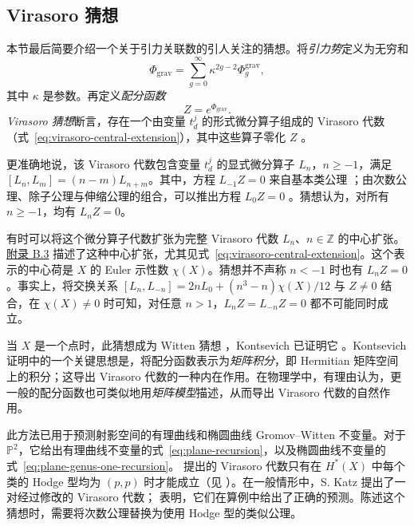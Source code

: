 \subsection{Virasoro 猜想}\label{subsec:virasoro-conjecture}
本节最后简要介绍一个关于引力关联数的引人关注的猜想。将\emph{引力势}定义为无穷和
\[
\Phi_{\mathrm{grav}}=\sum_{g=0}^{\infty}\kappa^{2g-2}\Phi_g^{\mathrm{grav}},
\]
其中 $\kappa$ 是参数。再定义\emph{配分函数}
\[
Z=e^{\Phi_{\mathrm{grav}}}.
\]
\emph{Virasoro 猜想}断言，存在一个由变量 $t_d^j$ 的形式微分算子组成的 Virasoro 代数（式~\eqref{eq:virasoro-central-extension}），其中这些算子零化 $Z$ 。

更准确地说，该 Virasoro 代数包含变量 $t_d^j$ 的显式微分算子 $L_n$，$n\ge-1$，满足 $[L_n,L_m]=(n-m)L_{n+m}$。其中，方程 $L_{-1}Z=0$ 来自基本类公理 ；由次数公理、除子公理与伸缩公理的组合，可以推出方程 $L_0Z=0$ 。猜想认为，对所有 $n\ge-1$，均有 $L_nZ=0$。

有时可以将这个微分算子代数扩张为完整 Virasoro 代数 $L_n$、$n\in\mathbb Z$ 的中心扩张。\hyperref[sec:conformal-field-theories]{附录 B.3} 描述了这种中心扩张，尤其见式~\eqref{eq:virasoro-central-extension}。这个表示的中心荷是 $X$ 的 Euler 示性数 $\chi(X)$。猜想并不声称 $n<-1$ 时也有 $L_nZ=0$。事实上，将交换关系 $[L_n,L_{-n}]=2nL_0+(n^3-n)\chi(X)/12$ 与 $Z\ne0$ 结合，在 $\chi(X)\ne0$ 时可知，对任意 $n>1$，$L_nZ=L_{-n}Z=0$ 都不可能同时成立。

当 $X$ 是一个点时，此猜想成为 Witten 猜想 ，Kontsevich 已证明它 。Kontsevich 证明中的一个关键思想是，将配分函数表示为\emph{矩阵积分}，即 Hermitian 矩阵空间上的积分；这导出 Virasoro 代数的一种内在作用。在物理学中，有理由认为，更一般的配分函数也可类似地用\emph{矩阵模型}描述，从而导出 Virasoro 代数的自然作用。

此方法已用于预测射影空间的有理曲线和椭圆曲线 Gromov--Witten 不变量。对于 $\mathbb P^2$，它给出有理曲线不变量的式~\eqref{eq:plane-recursion}，以及椭圆曲线不变量的式~\eqref{eq:plane-genus-one-recursion}。
 提出的 Virasoro 代数只有在 $H^*(X)$ 中每个类的 Hodge 型均为 $(p,p)$ 时才能成立（见 ）。在一般情形中，S. Katz 提出了一对经过修改的 Virasoro 代数； 表明，它们在算例中给出了正确的预测。陈述这个猜想时，需要将次数公理替换为使用 Hodge 型的类似公理。

